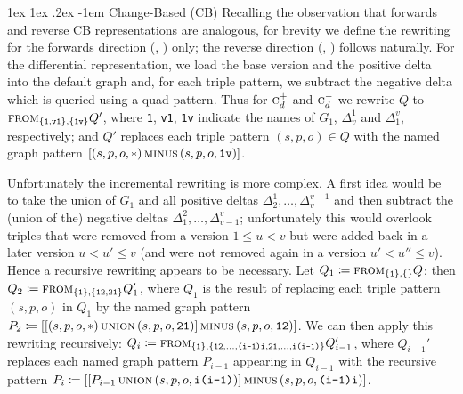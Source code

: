 \documentclass{llncs}
\makeatletter
\renewcommand\paragraph{\@startsection{paragraph}{4}{\z@}%
	{1ex \@plus1ex \@minus.2ex}%
	{-1em}%
	{\normalfont\normalsize\itshape}}
\newcommand{\ssyn}[3]{[\ensuremath{#1\,\textsc{#2}\,#3}]}
\newcommand{\suni}[2]{\ssyn{#1}{union}{#2}}
\newcommand{\sminus}[2]{\ssyn{#1}{minus}{#2}}
\newcommand{\sfrom}[3]{\ensuremath{\textsc{from}_{#2,#3}#1}}
\makeatother
\begin{document}
\paragraph{Change-Based (CB)} Recalling the observation that forwards and reverse CB representations are analogous, for brevity we define the rewriting for the forwards direction (\cbpd, \cbpi) only; the reverse direction (\cbmd, \cbmi) follows naturally. For the differential representation, we load the base version and the positive delta into the default graph and, for each triple pattern, we subtract the negative delta which is queried using a quad pattern. Thus for $\textsc{c}_d^{+}$ and $\textsc{c}_d^{-}$ we rewrite $Q$ to  \sfrom{Q'}{\{\texttt{1},\texttt{v1}\}}{\{\texttt{1v}\}}, where \texttt{1}, \texttt{v1}, \texttt{1v} indicate the names of $G_1$, $\Delta_v^1$ and $\Delta_1^v$, respectively; and $Q'$ replaces each triple pattern $(s,p,o) \in Q$ with the named graph pattern $\sminus{(s,p,o,*)}{(s,p,o,\texttt{1v})}$. 

Unfortunately the incremental rewriting is more complex. A first idea would be to take the union of $G_1$ and all positive deltas $\Delta_2^1, \ldots, \Delta_v^{v-1}$ and then subtract the (union of the) negative deltas $\Delta_1^2, \ldots, \Delta_{v-1}^{v}$; unfortunately this would overlook triples that were removed from a version $1 \leq u < v$ but were added back in a later version $u < u' \leq v$ (and were not removed again in a version $u' < u'' \leq v$). Hence a recursive rewriting appears to be necessary. Let $Q_1 \coloneqq \sfrom{Q}{\{\texttt{1}\}}{\{\}}$; then $Q_2 \coloneqq \sfrom{Q'_1}{\{\texttt{1}\}}{\{\texttt{12},\texttt{21}\}}$, where $Q_1$ is the result of replacing each triple pattern $(s,p,o)$ in $Q_1$ by the named graph pattern $P_2 \coloneqq \sminus{\suni{(s,p,o,*)}{(s,p,o,\texttt{21})}}{(s,p,o,\texttt{12})}$. We can then apply this rewriting recursively: $Q_i \coloneqq \sfrom{Q_{i-1}'}{\{\texttt{1}\}}{\{\texttt{12},\ldots,\texttt{(i-1)i},\texttt{21},\ldots,\texttt{i(i-1)}\}}$, where $Q_{i-1}'$ replaces each named graph pattern $P_{i-1}$ appearing in $Q_{i-1}$ with the recursive pattern $P_i \coloneqq \sminus{\suni{P_{i-1}}{(s,p,o,\texttt{i(i-1)})}}{(s,p,o,\texttt{(i-1)i})}$.
\end{document}
